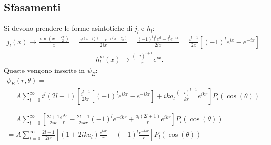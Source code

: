 \subsection{Sfasamenti} %
Si devono prendere le forme asintotiche di $j_l$ e $h_l$:
\begin{equation}\begin{split}
j_l\left(x\right)\rightarrow \frac{\sin{\left(x-\frac{l\pi}{2}\right)}}{x}=\frac{e^{i\left(x-l\frac{\pi}{2}\right)}-e^{-i\left(x-l\frac{\pi}{2}\right)}}{2ix}=\frac{\left(-1\right)^li^le^{il}-i^le^{-ix}}{2ix}=\frac{i^{l-1}}{2x}\left[\left(-1\right)^le^{ix}-e^{-ix}\right]
\end{split}\end{equation}
\begin{equation}\begin{split}
h^m_l\left(x\right)\rightarrow \frac{\left(-i\right)^{l+1}}{x}e^{ix}.
\end{split}\end{equation}
Queste vengono inserite in $\psi _E$:
\begin{equation}\begin{split}
\psi _E\left(r,\theta\right)=\\
=A\sum_{l=0}^{\infty }{i^l\left(2l+1\right)\left[\frac{i^{l-1}}{2kr}\left[\left(-1\right)^le^{ikr}-e^{-ikr}\right]+ika_l\frac{\left(-i\right)^{l+1}}{kr}e^{ikr}\right]P_l\left(\cos{\left(\theta\right)}\right)}=\\
= =\\
=A\sum_{l=0}^{\infty }{\left[\frac{2l+1}{2ik}\frac{e^{ikr}}{r}-\frac{2l+1}{2ikr}\left(-1\right)^le^{-ikr}+\frac{a_l\left(2l+1\right)}{r}e^{ikr}\right]P_l\left(\cos{\left(\theta\right)}\right)}=\\
=A\sum_{l=0}^{\infty }{\frac{2l+1}{2ir}\left[\left(1+2ika_l\right)\frac{e^{ikr}}{r}-\left(-1\right)^l\frac{e^{-ikr}}{r}\right]P_l\left(\cos{\left(\theta\right)}\right)}
\end{split}\end{equation}


